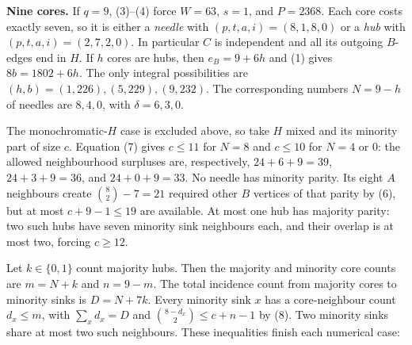 \documentclass[11pt,a4paper]{article}
\begin{document}
\textbf{Nine cores.} If \(q=9\), (3)--(4) force \(W=63\), \(s=1\), and \(P=2368\). Each core costs exactly seven, so it is either a \emph{needle} with \((p,t,a,i)=(8,1,8,0)\) or a \emph{hub} with \((p,t,a,i)=(2,7,2,0)\). In particular \(C\) is independent and all its outgoing \(B\)-edges end in \(H\). If \(h\) cores are hubs, then \(e_B=9+6h\) and (1) gives \(8b=1802+6h\). The only integral possibilities are \((h,b)=(1,226),(5,229),(9,232)\). The corresponding numbers \(N=9-h\) of needles are \(8,4,0\), with \(\delta=6,3,0\).

The monochromatic-\(H\) case is excluded above, so take \(H\) mixed and its minority part of size \(c\). Equation (7) gives \(c\le11\) for \(N=8\) and \(c\le10\) for \(N=4\) or \(0\): the allowed neighbourhood surpluses are, respectively, \(24+6+9=39\), \(24+3+9=36\), and \(24+0+9=33\). No needle has minority parity. Its eight \(A\) neighbours create \(\binom82-7=21\) required other \(B\) vertices of that parity by (6), but at most \(c+9-1\le19\) are available. At most one hub has majority parity: two such hubs have seven minority sink neighbours each, and their overlap is at most two, forcing \(c\ge12\).

Let \(k\in\{0,1\}\) count majority hubs. Then the majority and minority core counts are \(m=N+k\) and \(n=9-m\). The total incidence count from majority cores to minority sinks is \(D=N+7k\). Every minority sink \(x\) has a core-neighbour count \(d_x\le m\), with \(\sum_x d_x=D\) and \(\binom{8-d_x}{2}\le c+n-1\) by (8). Two minority sinks share at most two such neighbours. These inequalities finish each numerical case:
\end{document}
